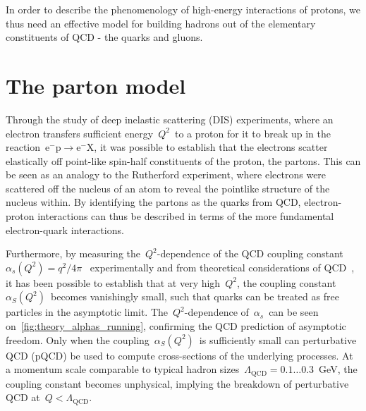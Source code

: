 In order to describe the phenomenology of high-energy interactions of protons, we thus need an effective model for building hadrons out of the elementary constituents of QCD - the quarks and gluons.

\section{The parton model}
Through the study of deep inelastic scattering (DIS) experiments, where an electron transfers sufficient energy~$Q^2$~to a proton for it to break up in the reaction~$\mathrm{e}^- \mathrm{p} \rightarrow \mathrm{e}^- \mathrm{X}$, it was possible to establish that the electrons scatter elastically off point-like spin-half constituents of the proton, the partons. This can be seen as an analogy to the Rutherford experiment, where electrons were scattered off the nucleus of an atom to reveal the pointlike structure of the nucleus within. By identifying the partons as the quarks from QCD, electron-proton interactions can thus be described in terms of the more fundamental electron-quark interactions.

Furthermore, by measuring the~$Q^2$-dependence of the QCD coupling constant~$\alpha_s(Q^2) = q^2 / 4\pi$~ experimentally and from theoretical considerations of QCD~\cite{PhysRevLett.30.1343,PhysRevLett.30.1346}, it has been possible to establish that at very high~$Q^2$, the coupling constant~$\alpha_S(Q^2)$~becomes vanishingly small, such that quarks can be treated as free particles in the asymptotic limit. The~$Q^2$-dependence of~$\alpha_s$~can be seen on~\cref{fig:theory_alphas_running}, confirming the QCD prediction of asymptotic freedom. Only when the coupling~$\alpha_S(Q^2)$~is sufficiently small can perturbative QCD (pQCD) be used to compute cross-sections of the underlying processes. At a momentum scale comparable to typical hadron sizes~$\Lambda_{\mathrm{QCD}} = 0.1\dots0.3$~GeV, the coupling constant becomes unphysical, implying the breakdown of perturbative QCD at~$Q < \Lambda_{\mathrm{QCD}}$.

